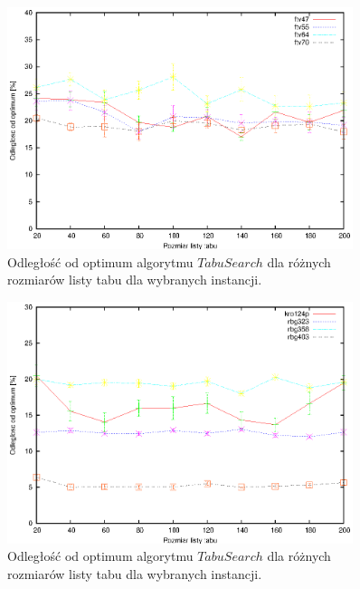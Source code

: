 \begin{figure}
\begin{center}
\includegraphics[width=0.9\textwidth]{wykresy/tabu_quality_size_3}
\end{center}
\caption{Odległość od optimum algorytmu $Tabu Search$ dla różnych rozmiarów
listy tabu dla wybranych instancji.}
\label{tabu_quality_size_3}
\end{figure}

\begin{figure}
\begin{center}
\includegraphics[width=0.9\textwidth]{wykresy/tabu_quality_size_4}
\end{center}
\caption{Odległość od optimum algorytmu $Tabu Search$ dla różnych rozmiarów
listy tabu dla wybranych instancji.}
\label{tabu_quality_size_4}
\end{figure}


